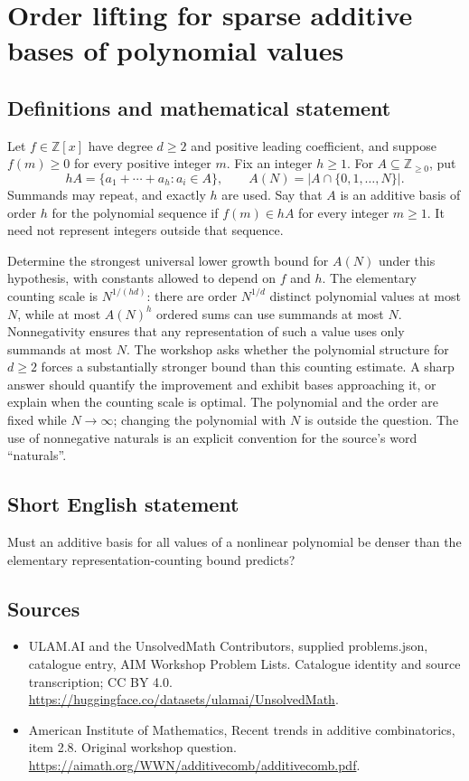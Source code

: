 \documentclass[11pt,a4paper]{article}
\begin{document}
\section*{Order lifting for sparse additive bases of polynomial values}\label{statement}

\subsection{Definitions and mathematical statement}
Let $f\in\mathbb Z[x]$ have degree $d\geq2$ and positive leading coefficient, and suppose $f(m)\geq0$ for every positive integer $m$.
Fix an integer $h\geq1$.
For $A\subseteq\mathbb Z_{\geq0}$, put
\[
 hA=\{a_1+\cdots+a_h:a_i\in A\},\qquad
 A(N)=|A\cap\{0,1,\ldots,N\}|.
\]
Summands may repeat, and exactly $h$ are used.
Say that $A$ is an additive basis of order $h$ for the polynomial sequence if $f(m)\in hA$ for every integer $m\geq1$.
It need not represent integers outside that sequence.

Determine the strongest universal lower growth bound for $A(N)$ under this hypothesis, with constants allowed to depend on $f$ and $h$.
The elementary counting scale is $N^{1/(hd)}$: there are order $N^{1/d}$ distinct polynomial values at most $N$, while at most $A(N)^h$ ordered sums can use summands at most $N$.
Nonnegativity ensures that any representation of such a value uses only summands at most $N$.
The workshop asks whether the polynomial structure for $d\geq2$ forces a substantially stronger bound than this counting estimate.
A sharp answer should quantify the improvement and exhibit bases approaching it, or explain when the counting scale is optimal.
The polynomial and the order are fixed while $N\to\infty$; changing the polynomial with $N$ is outside the question.
The use of nonnegative naturals is an explicit convention for the source's word ``naturals''.
\subsection{Short English statement}
Must an additive basis for all values of a nonlinear polynomial be denser than the elementary representation-counting bound predicts?
\subsection{Sources}
\begin{itemize}
\item[S1] ULAM.AI and the UnsolvedMath Contributors, supplied problems.json, catalogue entry, AIM Workshop Problem Lists. Catalogue identity and source transcription; CC BY 4.0.
\url{https://huggingface.co/datasets/ulamai/UnsolvedMath}.
\item[S2] American Institute of Mathematics, Recent trends in additive combinatorics, item 2.8. Original workshop question.
\url{https://aimath.org/WWN/additivecomb/additivecomb.pdf}.
\end{itemize}
\end{document}
